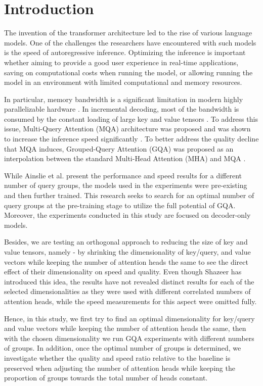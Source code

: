 \section{Introduction}
The invention of the transformer architecture led to the rise of various language models. One of the challenges the researchers have encountered with such models is the speed of autoregressive inference. Optimizing the inference is important whether aiming to provide a good user experience in real-time applications, saving on computational costs when running the model, or allowing running the model in an environment with limited computational and memory resources. 

In particular, memory bandwidth is a significant limitation in modern highly parallelizable hardware \cite{pope_efficiently_2022}\cite{shazeer_fast_2019}\cite{williams_roofline_2009}. In incremental decoding, most of the bandwidth is consumed by the constant loading of large key and value tensors \cite{shazeer_fast_2019}. To address this issue, Multi-Query Attention (MQA) architecture was proposed and was shown to increase the inference speed significantly \cite{shazeer_fast_2019}. To better address the quality decline that MQA induces, Grouped-Query Attention (GQA) was proposed as an interpolation between the standard Multi-Head Attention (MHA) and MQA \cite{ainslie_gqa_2023}.

While Ainslie et al. \cite{ainslie_gqa_2023} present the performance and speed results for a different number of query groups, the models used in the experiments were pre-existing and then further trained. This research seeks to search for an optimal number of query groups at the pre-training stage to utilize the full potential of GQA. Moreover, the experiments conducted in this study are focused on decoder-only models. 

Besides, we are testing an orthogonal approach to reducing the size of key and value tensors, namely - by shrinking the dimensionality of key/query, and value vectors while keeping the number of attention heads the same to see the direct effect of their dimensionality on speed and quality. Even though Shazeer \cite{shazeer_fast_2019} has introduced this idea, the results have not revealed distinct results for each of the selected dimensionalities as they were used with different correlated numbers of attention heads, while the speed measurements for this aspect were omitted fully. 

Hence, in this study, we first try to find an optimal dimensionality for key/query and value vectors while keeping the number of attention heads the same, then with the chosen dimensionality we run GQA experiments with different numbers of groups. In addition, once the optimal number of groups is determined, we investigate whether the quality and speed ratio relative to the baseline is preserved when adjusting the number of attention heads while keeping the proportion of groups towards the total number of heads constant.  


